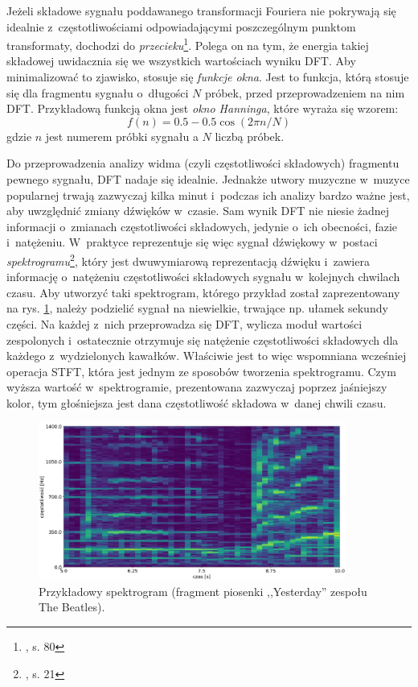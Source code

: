 Jeżeli składowe sygnału poddawanego transformacji Fouriera nie pokrywają się idealnie z~częstotliwościami odpowiadającymi poszczególnym punktom transformaty, dochodzi do \emph{przecieku}\footnote{\cite{lyons_wprowadzenie_2000}, s. 80}. Polega on na tym, że energia takiej składowej uwidacznia się we wszystkich wartościach wyniku DFT. Aby minimalizować to zjawisko, stosuje się \emph{funkcje okna}. Jest to funkcja, którą stosuje się dla fragmentu sygnału o~długości $N$ próbek, przed przeprowadzeniem na nim DFT. Przykładową funkcją okna jest \emph{okno Hanninga}, które wyraża się wzorem:
\begin{equation}
    f(n) = 0.5 - 0.5 \cos (2 \pi n / N)
\end{equation}
gdzie $n$ jest numerem próbki sygnału a $N$ liczbą próbek.

Do przeprowadzenia analizy widma (czyli częstotliwości składowych) fragmentu pewnego sygnału, DFT nadaje się idealnie. Jednakże utwory muzyczne w~muzyce popularnej trwają zazwyczaj kilka minut i~podczas ich analizy bardzo ważne jest, aby uwzględnić zmiany dźwięków w~czasie. Sam wynik DFT nie niesie żadnej informacji o~zmianach częstotliwości składowych, jedynie o~ich obecności, fazie i~natężeniu.  W~praktyce reprezentuje się więc sygnał dźwiękowy w~postaci \emph{spektrogramu}\footnote{\cite{lerch_introduction_2012}, s. 21}, który jest dwuwymiarową reprezentacją dźwięku i~zawiera informację o~natężeniu częstotliwości składowych sygnału w~kolejnych chwilach czasu. Aby utworzyć taki spektrogram, którego przykład został zaprezentowany na rys.  \ref{fig:spektrogram}, należy podzielić sygnał na niewielkie, trwające np. ułamek sekundy części. Na każdej z~nich przeprowadza się DFT, wylicza moduł wartości zespolonych i~ostatecznie otrzymuje się natężenie częstotliwości składowych dla każdego z~wydzielonych kawałków. Właściwie jest to więc wspomniana wcześniej operacja STFT, która jest jednym ze sposobów tworzenia spektrogramu. Czym wyższa wartość w~spektrogramie, prezentowana zazwyczaj poprzez jaśniejszy kolor, tym głośniejsza jest dana częstotliwość składowa w~danej chwili czasu.

\begin{figure}[htb]
    \centering
    \includegraphics[width=0.9\textwidth]{images/spektrogram}
    \caption{Przykładowy spektrogram (fragment piosenki ,,Yesterday'' zespołu The Beatles).}
    \label{fig:spektrogram}
\end{figure}



